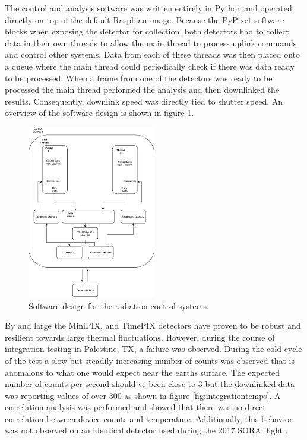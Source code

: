 The control and analysis software was written entirely in Python and operated directly on top of the default Raspbian image. Because the PyPixet software blocks when exposing the detector for collection, both detectors had to collect data in their own threads to allow the main thread to process uplink commands and control other systems. Data from each of these threads was then placed onto a queue where the main thread could periodically check if there was data ready to be processed. When a frame from one of the detectors was ready to be processed the main thread performed the analysis and then downlinked the results. Consequently, downlink speed was directly tied to shutter speed. An overview of the software design is shown in figure \ref{fig:softwaredesign}.
%
\begin{figure}[H]
	\begin{center}
	\includegraphics[width=0.5\textwidth]{figures/SoftwareDesign.pdf}
	\caption{Software design for the radiation control systems.}
	\label{fig:softwaredesign}
	\end{center}
\end{figure}
By and large the MiniPIX, and TimePIX detectors have proven to be robust and resilient towards large thermal fluctuations. However, during the course of integration testing in Palestine, TX, a failure was observed. During the cold cycle of the test a slow but steadily increasing number of counts was observed that is anomalous to what one would expect near the earths surface. The expected number of counts per second should've been close to 3 but the downlinked data was reporting values of over 300 as shown in figure \ref{fig:integrationtemps}.
A correlation analysis was performed and showed that there was no direct correlation between device counts and temperature. Additionally, this behavior was not observed on an identical detector used during the 2017 SORA flight \cite{SORA}. 

